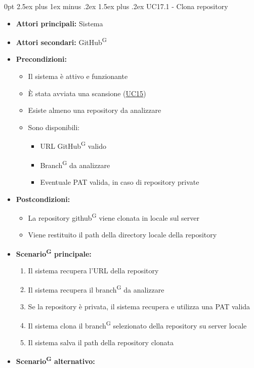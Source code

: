 \documentclass[a4paper, 11pt]{article}
\makeatletter
\renewcommand\paragraph{\@startsection{paragraph}{4}
  {0pt}
  {2.5ex plus 1ex minus .2ex}
  {1.5ex plus .2ex}
  {\normalfont\normalsize\bfseries\color{AccentDark}}}
\makeatother
\begin{document}
\paragraph{UC17.1 - Clona repository} \label{UC17.1}
\begin{itemize}
	\item \textbf{Attori principali:} Sistema
	\item \textbf{Attori secondari:} GitHub\textsuperscript{G}
	\item \textbf{Precondizioni:}
	\begin{itemize}
		\item Il sistema è attivo e funzionante
		\item È stata avviata una scansione (\hyperref[UC15]{UC15})
		\item Esiste almeno una repository da analizzare
		\item Sono disponibili:
		\begin{itemize}
			\item URL GitHub\textsuperscript{G} valido
			\item Branch\textsuperscript{G} da analizzare
			\item Eventuale PAT valida, in caso di repository private
		\end{itemize}
	\end{itemize}
	\item \textbf{Postcondizioni:} 
	\begin{itemize}
		\item La repository github\textsuperscript{G} viene clonata in locale sul server
		\item Viene restituito il path della directory locale della repository
	\end{itemize}
	\item \textbf{Scenario\textsuperscript{G} principale:}
	\begin{enumerate}
		\item Il sistema recupera l'URL della repository
		\item Il sistema recupera il branch\textsuperscript{G} da analizzare
		\item Se la repository è privata, il sistema recupera e utilizza una PAT valida
		\item Il sistema clona il branch\textsuperscript{G} selezionato della repository su server locale
		\item Il sistema salva il path della repository clonata
	\end{enumerate}
	\item \textbf{Scenario\textsuperscript{G} alternativo:}

\end{itemize}
\end{document}
